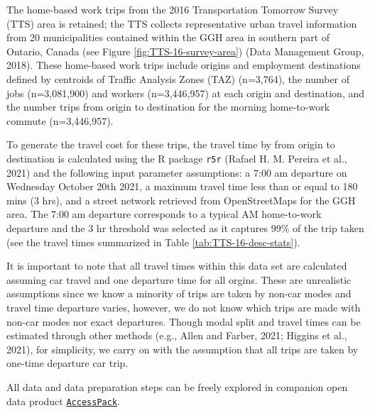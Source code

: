 \documentclass[]{elsarticle} %
\begin{document}
The home-based work trips from the 2016 Transportation Tomorrow Survey
(TTS) area is retained; the TTS collects representative urban travel
information from 20 municipalities contained within the GGH area in
southern part of Ontario, Canada (see Figure
\ref{fig:TTS-16-survey-area}) (Data Management Group, 2018). These
home-based work trips include origins and employment destinations
defined by centroids of Traffic Analysis Zones (TAZ) (n=3,764), the
number of jobs (n=3,081,900) and workers (n=3,446,957) at each origin
and destination, and the number trips from origin to destination for the
morning home-to-work commute (n=3,446,957).

To generate the travel cost for these trips, the travel time by from
origin to destination is calculated using the R package \texttt{r5r}
(Rafael H. M. Pereira et al., 2021) and the following input parameter
assumptions: a 7:00 am departure on Wednesday October 20th 2021, a
maximum travel time less than or equal to 180 mins (3 hrs), and a street
network retrieved from OpenStreetMaps for the GGH area. The 7:00 am
departure corresponds to a typical AM home-to-work departure and the 3
hr threshold was selected as it captures 99\% of the trip taken (see the
travel times summarized in Table \ref{tab:TTS-16-desc-stats}).

It is important to note that all travel times within this data set are
calculated assuming car travel and one departure time for all orgins.
These are unrealistic assumptions since we know a minority of trips are
taken by non-car modes and travel time departure varies, however, we do
not know which trips are made with non-car modes nor exact departures.
Though modal split and travel times can be estimated through other
methods (e.g., Allen and Farber, 2021; Higgins et al., 2021), for
simplicity, we carry on with the assumption that all trips are taken by
one-time departure car trip.

All data and data preparation steps can be freely explored in companion
open data product
\href{https://github.com/soukhova/AccessPack}{\texttt{AccessPack}}.
\end{document}
